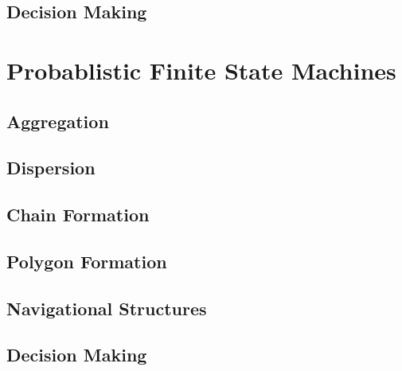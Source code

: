 \documentclass[]{article}
\begin{document}
\subsection{Decision Making}

\section{Probablistic Finite State Machines}

\subsection{Aggregation}

\subsection{Dispersion}

\subsection{Chain Formation}

\subsection{Polygon Formation}

\subsection{Navigational Structures}

\subsection{Decision Making}
\end{document}
